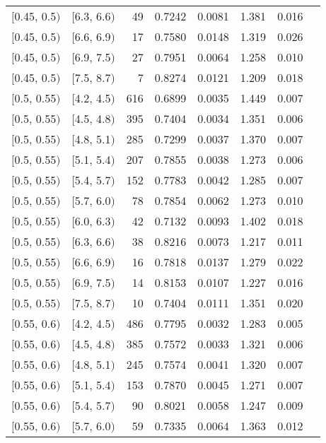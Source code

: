 \begin{longtable}{| l | l | r | r | r | r | r | r |}
        $[$0.45, 0.5$)$ & $[$6.3, 6.6$)$ & 49  & 0.7242 & 0.0081 & 1.381 & 0.016 \\
        $[$0.45, 0.5$)$ & $[$6.6, 6.9$)$ & 17  & 0.7580 & 0.0148 & 1.319 & 0.026 \\
        $[$0.45, 0.5$)$ & $[$6.9, 7.5$)$ & 27  & 0.7951 & 0.0064 & 1.258 & 0.010 \\
        $[$0.45, 0.5$)$ & $[$7.5, 8.7$)$ & 7   & 0.8274 & 0.0121 & 1.209 & 0.018 \\
        $[$0.5, 0.55$)$ & $[$4.2, 4.5$)$ & 616 & 0.6899 & 0.0035 & 1.449 & 0.007 \\
        $[$0.5, 0.55$)$ & $[$4.5, 4.8$)$ & 395 & 0.7404 & 0.0034 & 1.351 & 0.006 \\
        $[$0.5, 0.55$)$ & $[$4.8, 5.1$)$ & 285 & 0.7299 & 0.0037 & 1.370 & 0.007 \\
        $[$0.5, 0.55$)$ & $[$5.1, 5.4$)$ & 207 & 0.7855 & 0.0038 & 1.273 & 0.006 \\
        $[$0.5, 0.55$)$ & $[$5.4, 5.7$)$ & 152 & 0.7783 & 0.0042 & 1.285 & 0.007 \\
        $[$0.5, 0.55$)$ & $[$5.7, 6.0$)$ & 78  & 0.7854 & 0.0062 & 1.273 & 0.010 \\
        $[$0.5, 0.55$)$ & $[$6.0, 6.3$)$ & 42  & 0.7132 & 0.0093 & 1.402 & 0.018 \\
        $[$0.5, 0.55$)$ & $[$6.3, 6.6$)$ & 38  & 0.8216 & 0.0073 & 1.217 & 0.011 \\
        $[$0.5, 0.55$)$ & $[$6.6, 6.9$)$ & 16  & 0.7818 & 0.0137 & 1.279 & 0.022 \\
        $[$0.5, 0.55$)$ & $[$6.9, 7.5$)$ & 14  & 0.8153 & 0.0107 & 1.227 & 0.016 \\
        $[$0.5, 0.55$)$ & $[$7.5, 8.7$)$ & 10  & 0.7404 & 0.0111 & 1.351 & 0.020 \\
        $[$0.55, 0.6$)$ & $[$4.2, 4.5$)$ & 486 & 0.7795 & 0.0032 & 1.283 & 0.005 \\
        $[$0.55, 0.6$)$ & $[$4.5, 4.8$)$ & 385 & 0.7572 & 0.0033 & 1.321 & 0.006 \\
        $[$0.55, 0.6$)$ & $[$4.8, 5.1$)$ & 245 & 0.7574 & 0.0041 & 1.320 & 0.007 \\
        $[$0.55, 0.6$)$ & $[$5.1, 5.4$)$ & 153 & 0.7870 & 0.0045 & 1.271 & 0.007 \\
        $[$0.55, 0.6$)$ & $[$5.4, 5.7$)$ & 90  & 0.8021 & 0.0058 & 1.247 & 0.009 \\
        $[$0.55, 0.6$)$ & $[$5.7, 6.0$)$ & 59  & 0.7335 & 0.0064 & 1.363 & 0.012 \\

\end{longtable}
